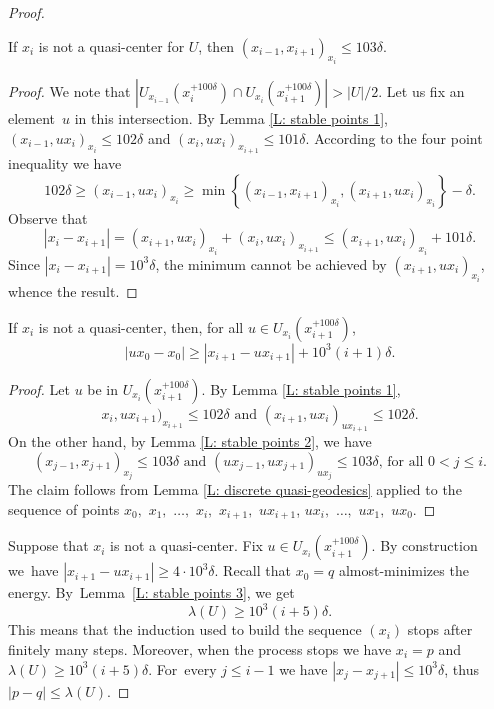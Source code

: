 \begin{proof}
\begin{lem}\label{L: stable points 2}
If $x_i$ is not a quasi-center for $U$, then $(x_{i-1},x_{i+1})_{x_i}\leqslant 103\delta$.
\end{lem}

\begin{proof}
We note that $ |U_{x_{i-1}}(x_{i}^{+100\delta}) \cap U_{x_{i}}(x_{i+1}^{+100\delta})|>|U|/2.$
Let us fix an element~$u$ in this intersection.
By Lemma \ref{L: stable points 1}, $(x_{i-1},ux_i)_{x_i} \leq 102\delta$ and $(x_{i},ux_{i})_{x_{i+1}}\leq 101\delta$.
According to the four point inequality we have
\begin{equation*}
102 \delta
\geq (x_{i-1},ux_i)_{x_i}
\geq \min \left\{ (x_{i-1},x_{i+1})_{x_i}, (x_{i+1},ux_i)_{x_i}\right\} - \delta.
\end{equation*}
Observe that
\begin{equation*}
|x_i - x_{i+1}|
= (x_{i+1}, ux_i)_{x_i} +(x_i,ux_i)_{x_{i+1}}
\leq (x_{i+1}, ux_i)_{x_i} + 101\delta.
\end{equation*}
Since $|x_i - x_{i+1}| = 10^3\delta$, the minimum cannot be achieved by $(x_{i+1},ux_i)_{x_i}$, whence the result.
\end{proof}

\begin{lem}\label{L: stable points 3} If $x_i$ is not a quasi-center, then, for all $u\in U_{x_i}(x_{i+1}^{+100 \delta})$,
\[
|ux_0 -x_0 | \geq |{x_{i+1}}-ux_{i+1}| + 10^3(i+1) \delta .
\]
\end{lem}

\begin{proof}
Let $u$ be in $U_{x_i}(x_{i+1}^{+100 \delta})$.
By Lemma \ref{L: stable points 1},
\begin{equation*}
x_i,ux_{i+1})_{x_{i+1}} \leq 102\delta \text{ and } (x_{i+1},ux_i)_{ux_{i+1}} \leq 102\delta.
\end{equation*}
On the other hand, by Lemma \ref{L: stable points 2}, we have
\begin{equation*}
(x_{j-1},x_{j+1})_{x_{j}} \leqslant 103\delta \text{ and } (ux_{j-1},ux_{j+1})_{ux_{j}}\leqslant 103\delta\text{, for all $0< j \leqslant i$}.
\end{equation*}
The claim follows from Lemma \ref{L: discrete quasi-geodesics} applied to the sequence of points $x_0,$ $x_1,$ $\dots,$ $x_i,$ $x_{i+1},$ $ux_{i+1}$, $ ux_i,$ $\dots,$ $ux_1,$ $ux_0$.
\end{proof}

Suppose that $x_i$ is not a quasi-center.
Fix $u\in U_{x_i}(x_{i+1}^{+100 \delta})$.
By construction we~have $|{x_{i+1}}-ux_{i+1}|\geq 4\cdot 10^3\delta$.
Recall that $x_0 = q$ almost-minimizes the energy.
By~Lemma~\ref{L: stable points 3}, we get
\[
\lambda(U) \geq 10^3(i+5) \delta. 
\]
This means that the induction used to build the sequence $(x_i)$ stops after finitely many steps.
Moreover, when the process stops we have $x_i = p$ and $\lambda(U) \geq 10^3(i+5) \delta$.
For~every $j \leq i-1$ we have $| x_j - x_{j+1}| \leq 10^3\delta$, thus $|p - q| \leq \lambda(U)$.
\end{proof}

